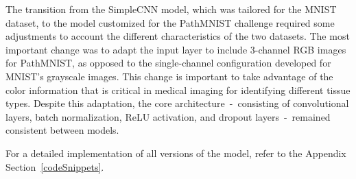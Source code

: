 The transition from the SimpleCNN model, which was tailored for the MNIST dataset, to the model customized for the PathMNIST challenge required some adjustments to account the different characteristics of the two datasets. The most important change was to adapt the input layer to include 3-channel RGB images for PathMNIST, as opposed to the single-channel configuration developed for MNIST's grayscale images. This change is important to take advantage of the color information that is critical in medical imaging for identifying different tissue types. Despite this adaptation, the core architecture~-~consisting of convolutional layers, batch normalization, ReLU activation, and dropout layers~-~remained consistent between models.

For a detailed implementation of all versions of the model, refer to the Appendix Section~\ref{codeSnippets}.\@